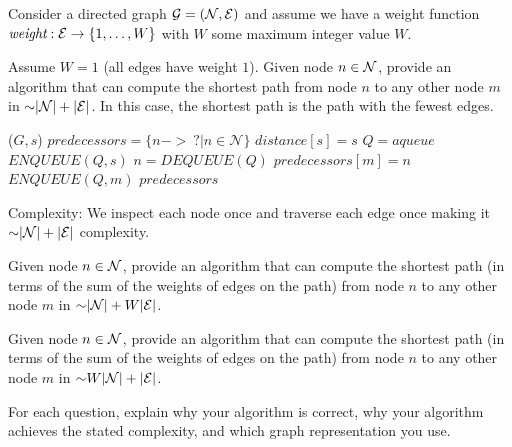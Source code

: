 \begin{problem}
Consider a directed graph $\mathcal{G} = (\mathcal{N}, \mathcal{E})$ and assume we have a weight function $\mathord{\textit{weight}} : \mathcal{E} \rightarrow \{1, \dots, W\}$ with $W$ some maximum integer value $W$.
\begin{questions}
\item Assume $W = 1$ (all edges have weight $1$). Given node $n \in \mathcal{N}$, provide an algorithm that can compute the shortest path from node $n$ to any other node $m$ in $\mathord{\sim}\lvert \mathcal{N} \rvert + \lvert \mathcal{E} \rvert$. In this case, the shortest path is the path with the fewest edges.

\begin{myalgo}{($G, s$)}
  \STATE $predecessors = \{n -> \:? | n \in \mathcal{N}\}$
  \STATE $distance[s] = s$
  \STATE $Q = a queue$
  \STATE $ENQUEUE(Q, s)$
    \STATE $n = DEQUEUE(Q)$
        \STATE $predecessors[m] = n$
        \STATE $ENQUEUE(Q, m)$
      \ENDIF
    \ENDFOR
  \ENDWHILE
  \RETURN $predecessors$
\end{myalgo}

Complexity: We inspect each node once and traverse each edge once making it $\mathord{\sim}\lvert \mathcal{N} \rvert + \lvert \mathcal{E} \rvert$ complexity.

\item Given node $n \in \mathcal{N}$, provide an algorithm that can compute the shortest path (in terms of the sum of the weights of edges on the path) from node $n$ to any other node $m$ in $\mathord{\sim}\lvert \mathcal{N} \rvert + W\lvert \mathcal{E} \rvert$.


\item Given node $n \in \mathcal{N}$, provide an algorithm that can compute the shortest path (in terms of the sum of the weights of edges on the path) from node $n$ to any other node $m$ in $\mathord{\sim}W\lvert \mathcal{N} \rvert + \lvert \mathcal{E} \rvert$.


\end{questions}
For each question, explain why your algorithm is correct, why your algorithm achieves the stated complexity, and which graph representation you use.
\end{problem}

\SUBMITMSG{}
\DEFAULTGRADING{}

